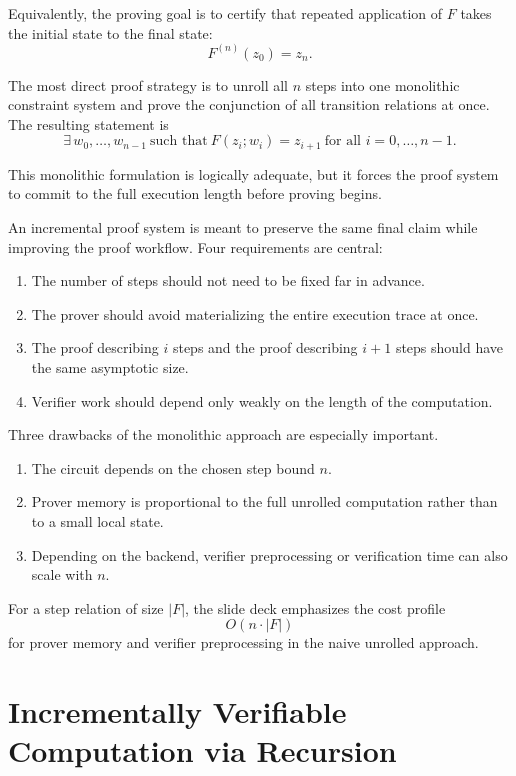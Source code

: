 \documentclass[11pt]{article}
\begin{document}
Equivalently, the proving goal is to certify that repeated application of $F$
takes the initial state to the final state:
\[
  F^{(n)}(z_0)=z_n.
\]

The most direct proof strategy is to unroll all $n$ steps into one monolithic
constraint system and prove the conjunction of all transition relations at
once.  The resulting statement is
\[
  \exists\, w_0,\ldots,w_{n-1}\ \text{such that}\ 
  F(z_i; w_i)=z_{i+1}\ \text{for all } i=0,\ldots,n-1.
\]

\begin{remark}
This monolithic formulation is logically adequate, but it forces the proof
system to commit to the full execution length before proving begins.
\end{remark}

An incremental proof system is meant to preserve the same final claim while
improving the proof workflow.  Four requirements are central:
\begin{enumerate}
  \item The number of steps should not need to be fixed far in advance.
  \item The prover should avoid materializing the entire execution trace at
        once.
  \item The proof describing $i$ steps and the proof describing $i+1$ steps
        should have the same asymptotic size.
  \item Verifier work should depend only weakly on the length of the
        computation.
\end{enumerate}

Three drawbacks of the monolithic approach are especially important.
\begin{enumerate}
  \item The circuit depends on the chosen step bound $n$.
  \item Prover memory is proportional to the full unrolled computation rather
        than to a small local state.
  \item Depending on the backend, verifier preprocessing or verification time
        can also scale with $n$.
\end{enumerate}

For a step relation of size $|F|$, the slide deck emphasizes the cost profile
\[
  O(n \cdot |F|)
\]
for prover memory and verifier preprocessing in the naive unrolled approach.

\section{Incrementally Verifiable Computation via Recursion}
\end{document}
